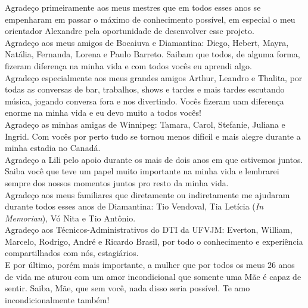 \begin{agradecimentos}
Agradeço primeiramente aos meus mestres que em todos esses anos se empenharam 
em passar o máximo de conhecimento possível, em especial o meu orientador 
Alexandre pela oportunidade de desenvolver esse projeto.\\
Agradeço aos meus amigos de Bocaiuva e Diamantina: Diego, Hebert, Mayra, Natália, Fernanda, Lorena e Paulo Barreto. Saibam que todos, de alguma forma, fizeram diferença na minha vida e com todos vocês eu aprendi algo.\\
Agradeço especialmente aos meus grandes amigos Arthur, Leandro e Thalita, por todas as conversas de bar, trabalhos, shows e tardes e mais tardes escutando música, jogando conversa fora e nos divertindo. Vocês fizeram uam diferença enorme na minha vida e eu devo muito a todos vocês!\\
Agradeço as minhas amigas de Winnipeg: Tamara, Carol, Stefanie, Juliana e Ingrid. Com vocês por perto tudo se tornou menos difícil e mais alegre durante a minha estadia no Canadá.\\
Agradeço a Lili pelo apoio durante os mais de dois anos em que estivemos juntos. Saiba você que teve um papel muito importante na minha vida e lembrarei sempre dos nossos momentos juntos pro resto da minha vida.\\
Agradeço aos meus familiares que diretamente ou indiretamente me ajudaram durante todos esses anos de Diamantina: Tio Vendoval, Tia Letícia (\textit{In Memorian}), Vó Nita e Tio Antônio.\\
Agradeço aos Técnicos-Administrativos do DTI da UFVJM: Everton, William, Marcelo, Rodrigo, André e Ricardo Brasil, por todo o conhecimento e experiência compartilhados com nós, estagiários.\\
E por último, porém mais importante, a mulher que por todos os meus 26 anos de vida me aturou com um amor incondicional que somente uma Mãe é capaz de sentir. Saiba, Mãe, que sem você, nada disso seria possível. Te amo incondicionalmente também!\\
\end{agradecimentos}
